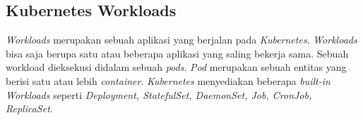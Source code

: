 \vspace{0.5cm}
\subsection{Kubernetes Workloads} \label{subsec:Komponen Worker Node}
\textit{Workloads} merupakan sebuah aplikasi yang berjalan pada \textit{Kubernetes}.
\textit{Workloads} bisa saja berupa satu atau beberapa aplikasi yang saling bekerja sama.
Sebuah workload dieksekusi didalam sebuah \textit{pods}. \textit{Pod} merupakan sebuah entitas yang berisi satu atau lebih \textit{container}.
\textit{Kubernetes} menyediakan beberapa \textit{built-in Workloads} seperti
\textit{Deployment, StatefulSet, DaemonSet, Job, CronJob, ReplicaSet}.
